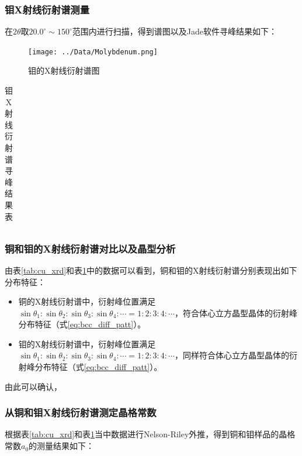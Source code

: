 \documentclass{thuemp}
\begin{document}
\subsubsection{钼X射线衍射谱测量}

在$2\theta$取$20.0^\circ \sim 150^\circ$范围内进行扫描，得到谱图以及Jade软件寻峰结果如下：

\begin{figure}[H]
    \centering
    \texttt{[image: ../Data/Molybdenum.png]}
    \caption{钼的X射线衍射谱图}
    \label{fig:mo_xrd}
\end{figure}

\begin{table}
    \centering
    \captionnamefont{\wuhao\bf\heiti}
    \captiontitlefont{\wuhao\bf\heiti}
    \caption{钼X射线衍射谱寻峰结果表}
    \label{tab:mo_xrd}
    \liuhao
    \begin{tabular}{ccccc}
        \toprule
        \midrule
        \bottomrule
    \end{tabular}
\end{table}

\subsubsection{铜和钼的X射线衍射谱对比以及晶型分析}

由表\ref{tab:cu_xrd}和表\ref{tab:mo_xrd}中的数据可以看到，铜和钼的X射线衍射谱分别表现出如下分布特征：

\begin{itemize}
    \item 铜的X射线衍射谱中，衍射峰位置满足$\sin{\theta_1} : \sin{\theta_2} :\sin{\theta_3} : \sin{\theta_4} : \cdots = 1 : 2 : 3 : 4 : \cdots$，符合体心立方晶型晶体的衍射峰分布特征（式\ref{eq:bcc_diff_patt}）。
    \item 钼的X射线衍射谱中，衍射峰位置满足$\sin{\theta_1} : \sin{\theta_2} :\sin{\theta_3} : \sin{\theta_4} : \cdots = 1 : 2 : 3 : 4 : \cdots$，同样符合体心立方晶型晶体的衍射峰分布特征（式\ref{eq:bcc_diff_patt}）。
\end{itemize}

由此可以确认，

\subsubsection{从铜和钼X射线衍射谱测定晶格常数}

根据表\ref{tab:cu_xrd}和表\ref{tab:mo_xrd}当中数据进行Nelson-Riley外推，得到铜和钼样品的晶格常数$a_0$的测量结果如下：
\end{document}
